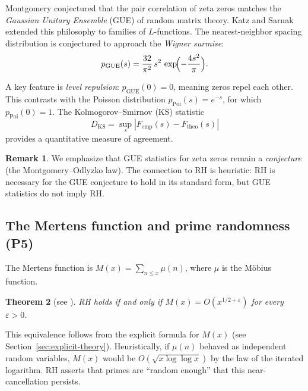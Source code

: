 \documentclass[11pt,a4paper]{article}
\newtheorem{theorem}{Theorem}[section]
\theoremstyle{definition}
\newtheorem{remark}[theorem]{Remark}
\begin{document}
Montgomery \cite{Montgomery1973} conjectured that the pair correlation of zeta zeros matches the \emph{Gaussian Unitary Ensemble} (GUE) of random matrix theory. Katz and Sarnak \cite{KatzSarnak1999} extended this philosophy to families of $L$-functions. The nearest-neighbor spacing distribution is conjectured to approach the \emph{Wigner surmise}:
\begin{equation}\label{eq:wigner}
  p_{\mathrm{GUE}}(s) = \frac{32}{\pi^2}\, s^2\, \exp\!\Bigl(-\frac{4s^2}{\pi}\Bigr).
\end{equation}

A key feature is \emph{level repulsion}: $p_{\mathrm{GUE}}(0) = 0$, meaning zeros repel each other. This contrasts with the Poisson distribution $p_{\mathrm{Poi}}(s) = e^{-s}$, for which $p_{\mathrm{Poi}}(0) = 1$. The Kolmogorov--Smirnov (KS) statistic
\begin{equation}\label{eq:ks}
  D_{\mathrm{KS}} = \sup_s |F_{\mathrm{emp}}(s) - F_{\mathrm{theo}}(s)|
\end{equation}
provides a quantitative measure of agreement.

\begin{remark}
We emphasize that GUE statistics for zeta zeros remain a \emph{conjecture} (the Montgomery--Odlyzko law). The connection to RH is heuristic: RH is necessary for the GUE conjecture to hold in its standard form, but GUE statistics do not imply RH.
\end{remark}

\subsection{The Mertens function and prime randomness (P5)}

The Mertens function is $M(x) = \sum_{n \leq x} \mu(n)$, where $\mu$ is the M\"obius function.

\begin{theorem}[{see \cite[Ch.~14]{Titchmarsh1986}}]\label{thm:mertens-equiv}
RH holds if and only if $M(x) = O(x^{1/2+\varepsilon})$ for every $\varepsilon > 0$.
\end{theorem}

This equivalence follows from the explicit formula for $M(x)$ (see Section~\ref{sec:explicit-theory}). Heuristically, if $\mu(n)$ behaved as independent random variables, $M(x)$ would be $O(\sqrt{x \log\log x})$ by the law of the iterated logarithm. RH asserts that primes are ``random enough'' that this near-cancellation persists.
\end{document}
